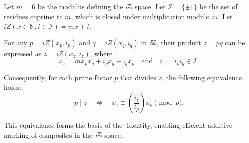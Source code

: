 \documentclass{article}
\begin{document}
\medskip
\begin{lemma}
    \label{lem:iZ}
    Let $m = 6$ be the modulus defining the $\textit{i}\mathbb{Z}$ space.
    Let $\mathcal{I} = \{\pm 1\}$ be the set of residues coprime to $m$, which is closed under multiplication modulo $m$.
    Let $iZ(x \in \mathbb{N}, i \in \mathcal{I}) = mx + i$.

    \noindent 
    For any $p=iZ(x_p,i_p)$ and $q=iZ(x_q,i_q)$ in $\textit{i}\mathbb{Z}$, their product $z=pq$ can be expressed as $z=iZ(x_z,i_z)$, where
    \[
    x_z = m x_p x_q + i_p x_q + i_q x_p
    \quad\text{and}\quad
    i_z = i_p i_q \in \mathcal{I}.
    \]

    \noindent 
    Consequently, for each prime factor $p$ that divides $z$, the following equivalence holds:
    \[
    p \mid z \quad \Longleftrightarrow \quad x_z \equiv \left(\frac{i_z}{i_p}\right) x_p \pmod{p}.
    \]
    
    \noindent
    This equivalence forms the basis of the \Xp-Identity, enabling efficient additive marking of composites in the $\textit{i}\mathbb{Z}$ space.
\end{lemma}
\end{document}
